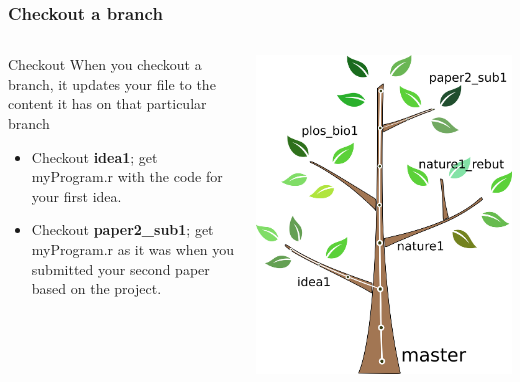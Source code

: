 \documentclass{beamer}
\begin{document}
\begin{frame}
  \frametitle{Checkout a branch}
  \begin{columns}[T]
    \begin{column}{.5\textwidth}
      \begin{block}{Checkout}
        When you \alert{checkout} a branch, it updates your file to the
        content it has on that particular branch
        \begin{itemize}
          \item Checkout \textbf{idea1}; get myProgram.r with the code for
            your first idea.
          \item Checkout \textbf{paper2\_sub1}; get myProgram.r as it was
            when you submitted your second paper based on the project.
        \end{itemize}
      \end{block}
    \end{column}
    \begin{column}{.5\textwidth}
      \includegraphics[width=\textwidth]{tree_branchcommits.png}
    \end{column}
  \end{columns}
\end{frame}
\end{document}
